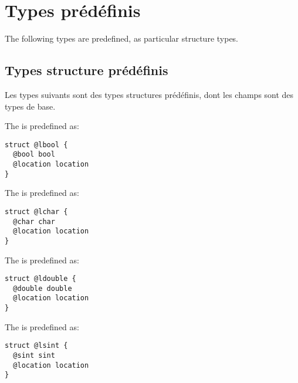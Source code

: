 
\chapter{Types prédéfinis}

The following types are predefined, as particular structure types.

\section{Types structure prédéfinis}

Les types suivants sont des types structures prédéfinis, dont les champs sont des types de base.
 

The  is predefined as:
\begin{lstlisting}[language=galgas]
struct @lbool {
  @bool bool
  @location location
}
\end{lstlisting}





The  is predefined as:
\begin{lstlisting}[language=galgas]
struct @lchar {
  @char char
  @location location
}
\end{lstlisting}








The  is predefined as:
\begin{lstlisting}[language=galgas]
struct @ldouble {
  @double double
  @location location
}
\end{lstlisting}








The  is predefined as:
\begin{lstlisting}[language=galgas]
struct @lsint {
  @sint sint
  @location location
}
\end{lstlisting}








